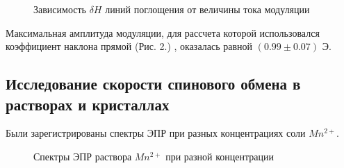 \documentclass[a4paper,12pt]{article}
\theoremstyle{plain} %
\theoremstyle{definition} %
\theoremstyle{remark} %
\begin{document}
\begin{figure}[h!]
	\caption{Зависимость $\delta H$ линий поглощения от величины тока модуляции}
	\label{fig:image}
\end{figure}

\newpage
\setcounter{page}{11}
Максимальная амплитуда модуляции, для рассчета которой использовался коэффициент наклона прямой (Рис. 2.) ,
оказалась равной $(0.99 \pm 0.07)$ Э.

\subsection{Исследование скорости спинового обмена в растворах и кристаллах}
Были зарегистрированы спектры ЭПР при разных концентрациях соли $Mn^{2+}$. 


\begin{figure}[h!]
	\caption{Спектры ЭПР раствора $Mn^{2+}$ при разной концентрации}
	\label{fig:image}
\end{figure}
\end{document}
